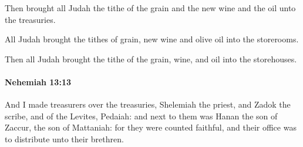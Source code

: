 			\begin{versebox}
					\item[BHS] 
					\item[LXX] 
					\item[ASV] Then brought all Judah the tithe of the grain and the new wine and the oil unto the treasuries.
					\item[NIV] All Judah brought the tithes of grain, new wine and olive oil into the storerooms.
					\item[NRSV] Then all Judah brought the tithe of the grain, wine, and oil into the storehouses.
			\end{versebox}

		\paragraph{Nehemiah 13:13} %
			\label{NEHEMIAH-13-13}

			And I made treasurers over the treasuries, Shelemiah the priest, and Zadok the scribe, and of the Levites, Pedaiah: and next to them was Hanan the son of Zaccur, the son of Mattaniah: for they were counted faithful, and their office was to distribute unto their brethren.


